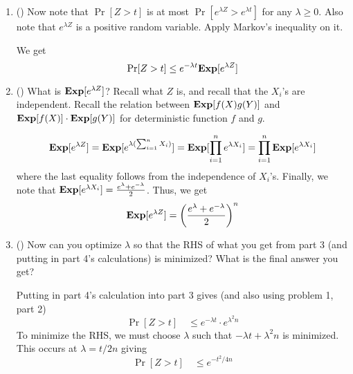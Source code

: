 \documentclass[11pt]{article}
\newcommand{\solution}[1]{\noindent {\color{blue} {\bf Solution:}} {\color{gray} {#1}}}
\newcommand{\solution}[1]{\ignore{#1}}
\begin{document}
\begin{exercise}
\begin{enumerate}
\begin{enumerate}
			\item (\Coffeecup)  Now note that $\Pr[Z > t]$ is at most $\Pr[e^{\lambda Z} > e^{\lambda t}]$ for any $\lambda \ge 0$. 
			Also note that $e^{\lambda Z}$ is a positive random variable.
			Apply Markov's inequality on it.
			
			\solution{
			We get 
			\[
			\Pr[Z > t] \leq e^{-\lambda t} \mathbf{Exp}[e^{\lambda Z}] 
			\]	
		}
			
			\item (\Coffeecup \Coffeecup) What is $\mathbf{Exp}[e^{\lambda Z}]$? Recall what $Z$ is, and recall that the $X_i$'s are independent. 
			Recall the relation between $\mathbf{Exp}[f(X)g(Y)]$ and $\mathbf{Exp}[f(X)]\cdot \mathbf{Exp}[g(Y)]$ for deterministic function $f$ and $g$.
		
		\solution{
		\[
		\mathbf{Exp}[e^{\lambda Z}] = \mathbf{Exp}[e^{\lambda(\sum_{i=1}^n X_i)}] = \mathbf{Exp}[\prod_{i=1}^n e^{\lambda X_i}] = \prod_{i=1}^n \mathbf{Exp}[e^{\lambda X_i}]
		\]
		where the last equality follows from the independence of $X_i$'s.
		Finally, we note that $\mathbf{Exp}[e^{\lambda X_i}] = \frac{e^\lambda + e^{-\lambda}}{2}$. Thus, we get
		\[
		\mathbf{Exp}[e^{\lambda Z}] = \left(\frac{e^\lambda + e^{-\lambda}}{2}\right)^n
		\]
}
			
			
			\item (\Coffeecup \Coffeecup) Now can you optimize $\lambda$ so that the RHS of what you get from part 3 (and putting in part 4's calculations) is minimized? What is the final answer you get?
			
	\solution{
	Putting in part 4's calculation into part 3 gives (and also using problem 1, part 2)
	\[
	\Pr[Z > t] \quad \leq e^{-\lambda t} \cdot e^{\lambda^2 n}
	\]
	To minimize the RHS, we must choose $\lambda$ such that $-\lambda t + \lambda^2 n$ is minimized. This occurs at $\lambda = t/2n$ giving
	\[
	\Pr[Z > t] \quad \leq e^{-t^2 / 4n}
	\]
	}		
		\end{enumerate}
	
	\end{enumerate}
\end{exercise}
\end{document}
